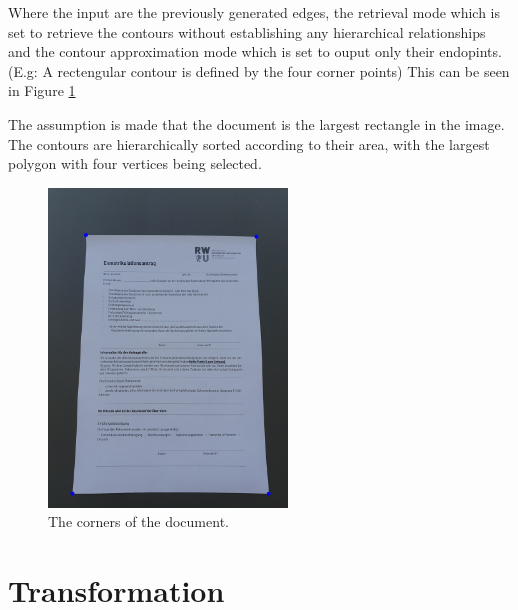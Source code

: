 \documentclass[twocolumn,10pt]{asme2ej}
\begin{document}
Where the input are the previously generated edges, the retrieval 
mode\cite{opencv_retrievalmode} which is 
set to retrieve the contours without establishing any hierarchical relationships 
and the contour approximation mode\cite{opencv_approxmode} which is set to ouput only their endopints.
(E.g: A rectengular contour is defined by the four corner points)
This can be seen in Figure \ref{fig:contours}

The assumption is made that the document is the largest rectangle in the image.
The contours are hierarchically sorted according to their area, with the largest polygon with four vertices being selected.

\begin{figure}
\centerline{\includegraphics[width=2.5in]{output/hoch_3_5_contouredimage.jpg}}
\caption{The corners of the document.}
\label{fig:contours}
\end{figure}

\cite{doi:10.3138/FM57-6770-U75U-7727}
\cite{RAMER1972244}




\section{Transformation}
\end{document}

